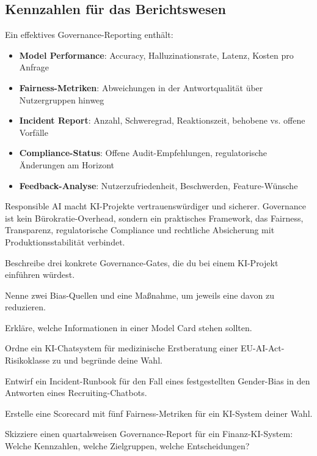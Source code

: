 \subsection{Kennzahlen für das Berichtswesen}

Ein effektives Governance-Reporting enthält:

\begin{itemize}[leftmargin=*]
    \item \textbf{Model Performance}: Accuracy, Halluzinationsrate, Latenz, Kosten pro Anfrage
    \item \textbf{Fairness-Metriken}: Abweichungen in der Antwortqualität über Nutzergruppen hinweg
    \item \textbf{Incident Report}: Anzahl, Schweregrad, Reaktionszeit, behobene vs. offene Vorfälle
    \item \textbf{Compliance-Status}: Offene Audit-Empfehlungen, regulatorische Änderungen am Horizont
    \item \textbf{Feedback-Analyse}: Nutzerzufriedenheit, Beschwerden, Feature-Wünsche
\end{itemize}

\begin{zusammenfassung}
Responsible AI macht KI-Projekte vertrauenswürdiger und sicherer. Governance ist kein Bürokratie-Overhead, sondern ein praktisches Framework, das Fairness, Transparenz, regulatorische Compliance und rechtliche Absicherung mit Produktionsstabilität verbindet.
\end{zusammenfassung}

\begin{uebungen}
    \item Beschreibe drei konkrete Governance-Gates, die du bei einem KI-Projekt einführen würdest.
    \item Nenne zwei Bias-Quellen und eine Maßnahme, um jeweils eine davon zu reduzieren.
    \item Erkläre, welche Informationen in einer Model Card stehen sollten.
    \item Ordne ein KI-Chatsystem für medizinische Erstberatung einer EU-AI-Act-Risikoklasse zu und begründe deine Wahl.
    \item Entwirf ein Incident-Runbook für den Fall eines festgestellten Gender-Bias in den Antworten eines Recruiting-Chatbots.
    \item Erstelle eine Scorecard mit fünf Fairness-Metriken für ein KI-System deiner Wahl.
    \item Skizziere einen quartalsweisen Governance-Report für ein Finanz-KI-System: Welche Kennzahlen, welche Zielgruppen, welche Entscheidungen?
\end{uebungen}

